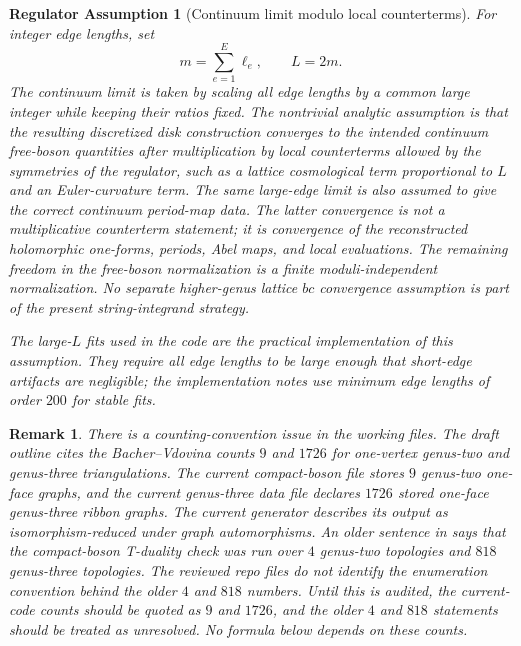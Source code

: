 \documentclass[11pt]{article}
\numberwithin{equation}{section}
\newtheorem{regulatorassumption}{Regulator Assumption}
\newtheorem{remark}{Remark}
\begin{document}
\begin{regulatorassumption}[Continuum limit modulo local counterterms]
For integer edge lengths, set
\begin{equation}
        m=\sum_{e=1}^{E}\ell_e,\qquad L=2m.
\end{equation}
The continuum limit is taken by scaling all edge lengths by a common large
integer while keeping their ratios fixed.  The nontrivial analytic assumption
is that the resulting discretized disk construction converges to the intended
continuum free-boson quantities after multiplication by local counterterms
allowed by the symmetries of the regulator, such as a lattice cosmological term
proportional to \(L\) and an Euler-curvature term.  The same large-edge limit is
also assumed to give the correct continuum period-map data.  The latter
convergence is not a multiplicative counterterm statement; it is convergence of
the reconstructed holomorphic one-forms, periods, Abel maps, and local
evaluations.  The remaining freedom in the free-boson normalization is a finite
moduli-independent normalization.
No separate higher-genus lattice \(bc\) convergence assumption is part of the
present string-integrand strategy.

The large-\(L\) fits used in the code are the practical implementation of this
assumption.  They require all edge lengths to be large enough that short-edge
artifacts are negligible; the implementation notes use minimum edge lengths of
order \(200\) for stable fits.
\end{regulatorassumption}

\begin{remark}
There is a counting-convention issue in the working files.  The draft outline
cites the Bacher--Vdovina counts \(9\) and \(1726\) for one-vertex genus-two
and genus-three triangulations.  The current compact-boson file
 stores \(9\) genus-two one-face graphs, and the
current genus-three data file  declares
\(1726\) stored one-face genus-three ribbon graphs.  The current generator
describes its output as isomorphism-reduced under graph automorphisms.  An
older sentence in  says that the compact-boson T-duality
check was run over \(4\) genus-two topologies and \(818\) genus-three
topologies.  The reviewed repo files do not identify the enumeration convention
behind the older \(4\) and \(818\) numbers.  Until this is audited, the
current-code counts should be quoted as \(9\) and \(1726\), and the older
\(4\) and \(818\) statements should be treated as unresolved.  No formula below
depends on these counts.
\end{remark}
\end{document}
